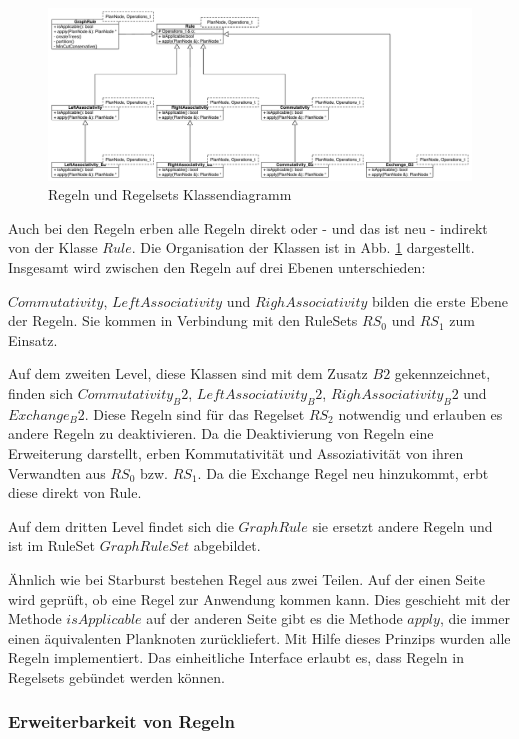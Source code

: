 \begin{figure}[h]
  \centering
  \includegraphics[width=\textwidth]{04_Implementierung/Rules.pdf}
  \caption{Regeln und Regelsets Klassendiagramm}
  \label{RuleClassDiagram}
\end{figure}


Auch bei den Regeln erben alle Regeln direkt oder - und das ist neu - indirekt von der Klasse $Rule$. Die Organisation der Klassen ist in Abb. \ref{RuleClassDiagram} dargestellt. Insgesamt wird zwischen den Regeln auf drei Ebenen unterschieden: 

$Commutativity$, $LeftAssociativity$ und $RighAssociativity$ bilden die erste Ebene der Regeln. Sie kommen in Verbindung mit den RuleSets $RS_0$ und $RS_1$ zum Einsatz.

Auf dem zweiten Level, diese Klassen sind mit dem Zusatz $B2$ gekennzeichnet, finden sich $Commutativity_B2$, $LeftAssociativity_B2$, $RighAssociativity_B2$ und $Exchange_B2$. Diese Regeln sind für das Regelset $RS_2$ notwendig und erlauben es andere Regeln zu deaktivieren. Da die Deaktivierung von Regeln eine Erweiterung darstellt, erben Kommutativität und Assoziativität von ihren Verwandten aus $RS_0$ bzw. $RS_1$. Da die Exchange Regel neu hinzukommt, erbt diese direkt von Rule.

Auf dem dritten Level findet sich die $GraphRule$ sie ersetzt andere Regeln und ist im RuleSet $GraphRuleSet$ abgebildet.


Ähnlich wie bei Starburst bestehen Regel aus zwei Teilen. Auf der einen Seite wird geprüft, ob eine Regel zur Anwendung kommen kann. Dies geschieht mit der Methode $isApplicable$ auf der anderen Seite gibt es die Methode $apply$, die immer einen äquivalenten Planknoten zurückliefert. Mit Hilfe dieses Prinzips wurden alle Regeln implementiert. Das einheitliche Interface erlaubt es, dass Regeln in Regelsets gebündet werden können.


\subsubsection{Erweiterbarkeit von Regeln}


